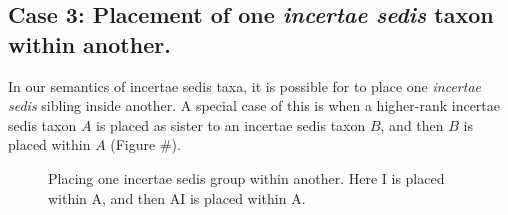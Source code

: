 \documentclass[english]{article}
\newcommand{\lyxdot}{.}
\begin{document}
\subsection{Case 3: Placement of one \emph{incertae sedis} taxon within
another.}

In our semantics of incertae sedis taxa, it is possible for to place
one \emph{incertae sedis} sibling inside another.
A special case of
this is when a higher-rank incertae sedis taxon $A$ is placed as
sister to an incertae sedis taxon $B$, and then $B$ is placed within
$A$ (Figure \#).

\begin{figure}

\caption{\label{fig:Placing-one-incertae}Placing one incertae sedis group
within another.
Here I is placed within A, and then AI is placed within
A.}
\end{figure}
\end{document}
